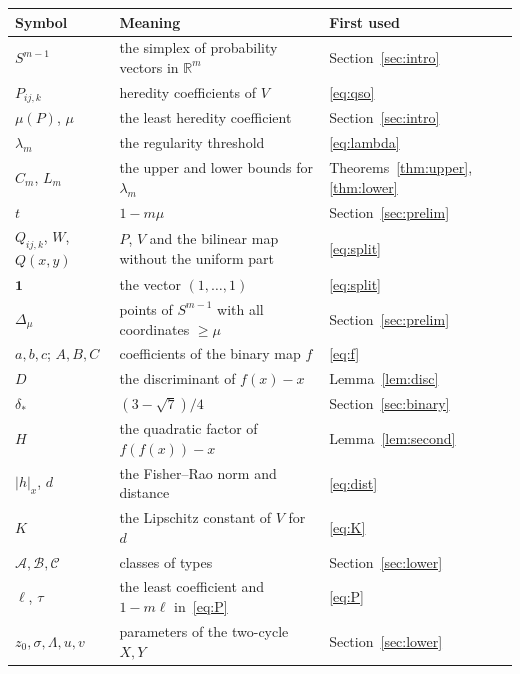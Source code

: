 \documentclass[11pt]{amsart}
\theoremstyle{definition}
\theoremstyle{remark}
\newcommand{\R}{\mathbb{R}}
\newcommand{\one}{\mathbf{1}}
\begin{document}
\begin{center}
\small
\begin{tabular}{lll}
\toprule
Symbol & Meaning & First used\\
\midrule
$S^{m-1}$ & the simplex of probability vectors in $\R^m$ & Section~\ref{sec:intro}\\
$P_{ij,k}$ & heredity coefficients of $V$ & \eqref{eq:qso}\\
$\mu(P)$, $\mu$ & the least heredity coefficient & Section~\ref{sec:intro}\\
$\lambda_m$ & the regularity threshold & \eqref{eq:lambda}\\
$C_m$, $L_m$ & the upper and lower bounds for $\lambda_m$ & Theorems~\ref{thm:upper}, \ref{thm:lower}\\
$t$ & $1-m\mu$ & Section~\ref{sec:prelim}\\
$Q_{ij,k}$, $W$, $Q(x,y)$ & $P$, $V$ and the bilinear map without the uniform part & \eqref{eq:split}\\
$\one$ & the vector $(1,\dots,1)$ & \eqref{eq:split}\\
$\Delta_\mu$ & points of $S^{m-1}$ with all coordinates $\ge\mu$ & Section~\ref{sec:prelim}\\
$a,b,c$; $A,B,C$ & coefficients of the binary map $f$ & \eqref{eq:f}\\
$D$ & the discriminant of $f(x)-x$ & Lemma~\ref{lem:disc}\\
$\delta_*$ & $(3-\sqrt7)/4$ & Section~\ref{sec:binary}\\
$H$ & the quadratic factor of $f(f(x))-x$ & Lemma~\ref{lem:second}\\
$|h|_x$, $d$ & the Fisher--Rao norm and distance & \eqref{eq:dist}\\
$K$ & the Lipschitz constant of $V$ for $d$ & \eqref{eq:K}\\
$\mathcal A,\mathcal B,\mathcal C$ & classes of types & Section~\ref{sec:lower}\\
$\ell$, $\tau$ & the least coefficient and $1-m\ell$ in~\eqref{eq:P} & \eqref{eq:P}\\
$z_0,\sigma,\Lambda,u,v$ & parameters of the two-cycle $X,Y$ & Section~\ref{sec:lower}\\
\bottomrule
\end{tabular}
\end{center}
\end{document}
